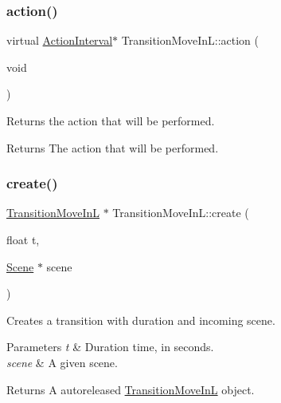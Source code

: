 \subsubsection{\texorpdfstring{action()}{action()}\hspace{0.1cm}{\footnotesize\ttfamily [2/2]}}
{\footnotesize\ttfamily virtual \hyperlink{classActionInterval}{Action\+Interval}$\ast$ Transition\+Move\+In\+L\+::action (\begin{DoxyParamCaption}\item[{void}]{ }\end{DoxyParamCaption})\hspace{0.3cm}{\ttfamily [virtual]}}

Returns the action that will be performed.

\begin{DoxyReturn}{Returns}
The action that will be performed. 
\end{DoxyReturn}
\mbox{\label{classTransitionMoveInL_a5e0d08e3fc7a5df21855ed93b112f68f}} 
\subsubsection{\texorpdfstring{create()}{create()}\hspace{0.1cm}{\footnotesize\ttfamily [1/2]}}
{\footnotesize\ttfamily \hyperlink{classTransitionMoveInL}{Transition\+Move\+InL} $\ast$ Transition\+Move\+In\+L\+::create (\begin{DoxyParamCaption}\item[{float}]{t,  }\item[{\hyperlink{classScene}{Scene} $\ast$}]{scene }\end{DoxyParamCaption})\hspace{0.3cm}{\ttfamily [static]}}

Creates a transition with duration and incoming scene.


\begin{DoxyParams}{Parameters}
{\em t} & Duration time, in seconds. \\
\hline
{\em scene} & A given scene. \\
\hline
\end{DoxyParams}
\begin{DoxyReturn}{Returns}
A autoreleased \hyperlink{classTransitionMoveInL}{Transition\+Move\+InL} object. 
\end{DoxyReturn}
\mbox{\label{classTransitionMoveInL_a8d95ce8733235baf8396842768db0cba}} 
